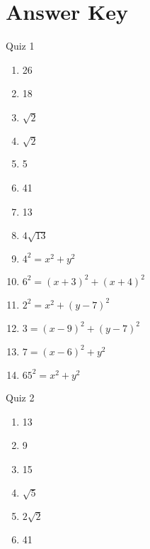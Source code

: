 \documentclass[12pt]{article}
\begin{document}
\section*{Answer Key}

\begin{multicols}{3}

Quiz 1
\begin{enumerate}

\item 26

\item 18

\item $\sqrt{2}$

\item $\sqrt{2}$

\item 5

\item 41

\item 13

\item $4\sqrt{13}$

\item $4^2=x^2+y^2$

\item $6^2=(x+3)^2+(x+4)^2$

\item $2^2=x^2+(y-7)^2$

\item $3=(x-9)^2+(y-7)^2$

\item $7=(x-6)^2+y^2$

\item $65^2=x^2+y^2$\\


\end{enumerate}

Quiz 2

\begin{enumerate}

\item 13

\item 9

\item 15

\item $\sqrt{5}$

\item $2\sqrt{2}$

\item 41


\end{enumerate}
\end{multicols}
\end{document}

